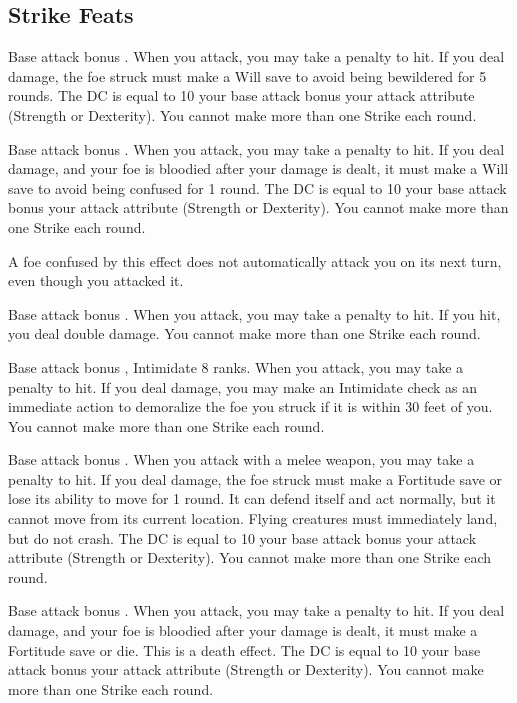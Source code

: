 \subsection{Strike Feats}

\featpre Base attack bonus .
\featben When you attack, you may take a  penalty to hit. If you deal damage, the foe struck must make a Will save to avoid being bewildered for 5 rounds. The DC is equal to 10 \add your base attack bonus \add your attack attribute (Strength or Dexterity). You cannot make more than one Strike each round.

\featpre Base attack bonus .
\featben When you attack, you may take a  penalty to hit. If you deal damage, and your foe is bloodied after your damage is dealt, it must make a Will save to avoid being confused for 1 round. The DC is equal to 10 \add your base attack bonus \add your attack attribute (Strength or Dexterity). You cannot make more than one Strike each round.

\confusionexplanation A foe confused by this effect does not automatically attack you on its next turn, even though you attacked it.

\featpre Base attack bonus .
\featben When you attack, you may take a  penalty to hit. If you hit, you deal double damage. You cannot make more than one Strike each round.

\featpres Base attack bonus , Intimidate 8 ranks.
\featben When you attack, you may take a  penalty to hit. If you deal damage, you may make an Intimidate check as an immediate action to demoralize the foe you struck if it is within 30 feet of you. You cannot make more than one Strike each round.

\featpre Base attack bonus .
\featben When you attack with a melee weapon, you may take a  penalty to hit. If you deal damage, the foe struck must make a Fortitude save or lose its ability to move for 1 round. It can defend itself and act normally, but it cannot move from its current location. Flying creatures must immediately land, but do not crash. The DC is equal to 10 \add your base attack bonus \add your attack attribute (Strength or Dexterity). You cannot make more than one Strike each round.

\featpre Base attack bonus .
\featben When you attack, you may take a  penalty to hit. If you deal damage, and your foe is bloodied after your damage is dealt, it must make a Fortitude save or die. This is a death effect. The DC is equal to 10 \add your base attack bonus \add your attack attribute (Strength or Dexterity). You cannot make more than one Strike each round.

